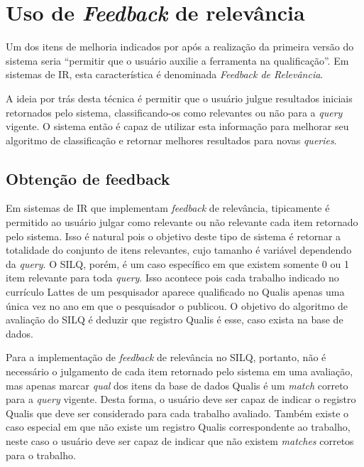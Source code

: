 \documentclass[12pt]{article}
\newcommand{\quotes}[1]{``#1''}
\begin{document}
\section{Uso de \textit{Feedback} de relevância} \label{cap:avaliacao}

Um dos itens de melhoria indicados por \cite{Silq1} após a realização da primeira versão do sistema seria \quotes{permitir que o usuário auxilie a ferramenta na qualificação}. Em sistemas de IR, esta característica é denominada \textit{Feedback de Relevância}.

A ideia por trás desta técnica é permitir que o usuário julgue resultados iniciais retornados pelo sistema, classificando-os como relevantes ou não para a \textit{query} vigente. O sistema então é capaz de utilizar esta informação para melhorar seu algoritmo de classificação e retornar melhores resultados para novas \textit{queries}.

\subsection{Obtenção de feedback} \label{sec:feedback}

Em sistemas de IR que implementam \textit{feedback} de relevância, tipicamente é permitido ao usuário julgar como relevante ou não relevante cada item retornado pelo sistema. Isso é natural pois o objetivo deste tipo de sistema é retornar a totalidade do conjunto de itens relevantes, cujo tamanho é variável dependendo da \textit{query}. O SILQ, porém, é um caso específico em que existem somente 0 ou 1 item relevante para toda \textit{query}. Isso acontece pois cada trabalho indicado no currículo Lattes de um pesquisador aparece qualificado no Qualis apenas uma única vez no ano em que o pesquisador o publicou. O objetivo do algoritmo de avaliação do SILQ é deduzir que registro Qualis é esse, caso exista na base de dados.

Para a implementação de \textit{feedback} de relevância no SILQ, portanto, não é necessário o julgamento de cada item retornado pelo sistema em uma avaliação, mas apenas marcar \textit{qual} dos itens da base de dados Qualis é um \textit{match} correto para a \textit{query} vigente. Desta forma, o usuário deve ser capaz de indicar o registro Qualis que deve ser considerado para cada trabalho avaliado. Também existe o caso especial em que não existe um registro Qualis correspondente ao trabalho, neste caso o usuário deve ser capaz de indicar que não existem \textit{matches} corretos para o trabalho.
\end{document}
